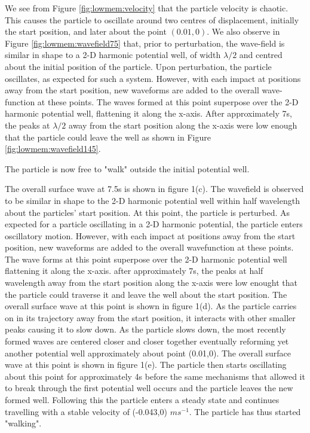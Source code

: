 We see from Figure \ref{fig:lowmem:velocity} that the particle velocity is chaotic. This causes the particle to oscillate around two centres of displacement, initially the start position, and later about the point $(0.01,0)$. We also observe in Figure \ref{fig:lowmem:wavefield75} that, prior to perturbation, the wave-field is similar in shape to a 2-D harmonic potential well, of width $\lambda/2$ and centred about the initial position of the particle. Upon perturbation, the particle oscillates, as expected for such a system. However, with each impact at positions away from the start position, new waveforms are added to the overall wave-function at these points. The waves formed at this point superpose over the 2-D harmonic potential well, flattening it along the x-axis. After approximately 7s, the peaks at $\lambda/2$ away from the start position along the x-axis were low enough that the particle could leave the well as shown in Figure \ref{fig:lowmem:wavefield145}.

The particle is now free to "walk" outside the initial potential well. 

The overall surface wave at 7.5s is shown in figure 1(c). The wavefield is observed to be similar in shape to the 2-D harmonic potential well within half wavelength about the particles' start position. At this point, the particle is perturbed. As expected for a particle oscillating in a 2-D harmonic potential, the particle enters oscillatory motion. However, with each impact at positions away from the start position, new waveforms are added to the overall wavefunction at these points. The wave forms at this point superpose over the 2-D harmonic potential well flattening it along the x-axis. after approximately 7s, the peaks at half wavelength away from the start position along the x-axis were low enought that the particle could traverse it and leave the well about the start position. The overall surface wave at this point is shown in figure 1(d). As the particle carries on in its trajectory away from the start position, it interacts with other smaller peaks causing it to slow down. As the particle slows down, the most recently formed waves are centered closer and closer together eventually reforming yet another potential well approximately about point (0.01,0). The overall surface wave at this point is shown in figure 1(e). The particle then starts oscillating about this point for approximately 4s before the same mechanisms that allowed it to break through the first potential well occurs and the particle leaves the new formed well. Following this the particle enters a steady state and continues travelling with a stable velocity of (-0.043,0) $ms^{-1}$. The particle has thus started "walking". 

